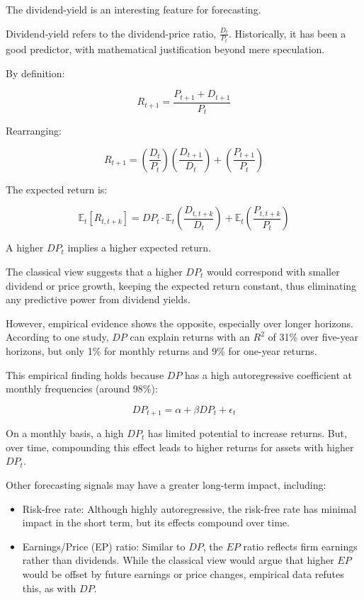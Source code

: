\documentclass{article}
\begin{document}
The dividend-yield is an interesting feature for forecasting.

Dividend-yield refers to the dividend-price ratio, $\frac{D_t}{P_t}$. Historically, it has been a good predictor, with mathematical justification beyond mere speculation.

By definition:

$$
R_{t+1} = \frac{P_{t+1} + D_{t+1}}{P_t}
$$

Rearranging:

$$
R_{t+1} = \left(\frac{D_t}{P_t}\right) \left(\frac{D_{t+1}}{D_t}\right) + \left(\frac{P_{t+1}}{P_t}\right)
$$

The expected return is:

$$
\mathbb{E}_t[R_{t, t+k}] = DP_t \cdot \mathbb{E}_t\left(\frac{D_{t, t+k}}{D_t}\right) + \mathbb{E}_t\left(\frac{P_{t, t+k}}{P_t}\right)
$$

A higher $DP_t$ implies a higher expected return.

The classical view suggests that a higher $DP_t$ would correspond with smaller dividend or price growth, keeping the expected return constant, thus eliminating any predictive power from dividend yields.

However, empirical evidence shows the opposite, especially over longer horizons. According to one study, $DP$ can explain returns with an $R^2$ of 31\% over five-year horizons, but only 1\% for monthly returns and 9\% for one-year returns.

This empirical finding holds because $DP$ has a high autoregressive coefficient at monthly frequencies (around 98\%):

$$DP_{t+1} = \alpha + \beta DP_t + \epsilon_t$$

On a monthly basis, a high $DP_t$ has limited potential to increase returns. But, over time, compounding this effect leads to higher returns for assets with higher $DP_t$.

Other forecasting signals may have a greater long-term impact, including:

\begin{itemize}
    \item Risk-free rate: Although highly autoregressive, the risk-free rate has minimal impact in the short term, but its effects compound over time.
    \item Earnings/Price (EP) ratio: Similar to $DP$, the $EP$ ratio reflects firm earnings rather than dividends. While the classical view would argue that higher $EP$ would be offset by future earnings or price changes, empirical data refutes this, as with $DP$.
\end{itemize}
\end{document}

